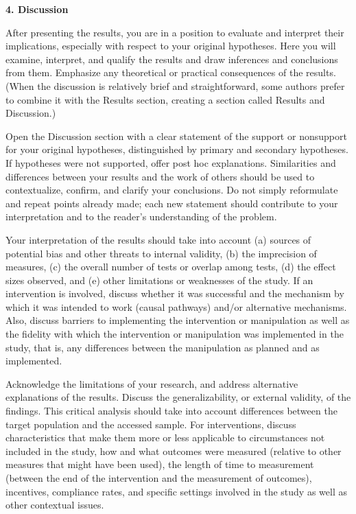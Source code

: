 \documentclass[twoside,10.5pt]{article}%
\begin{document}
\textbf{4. Discussion}

After presenting the results, you are in a position to evaluate and interpret their implications, especially with respect to your original hypotheses. Here you will examine, interpret, and qualify the results and draw inferences and conclusions from them. Emphasize any theoretical or practical consequences of the results. (When the discussion is relatively brief and straightforward, some authors prefer to combine it with the Results section, creating a section called Results and Discussion.)

Open the Discussion section with a clear statement of the support or nonsupport for your original hypotheses, distinguished by primary and secondary hypotheses. If hypotheses were not supported, offer post hoc explanations. Similarities and differences between your results and the work of others should be used to contextualize, confirm, and clarify your conclusions. Do not simply reformulate and repeat points already made; each new statement should contribute to your interpretation and to the reader's understanding of the problem.

Your interpretation of the results should take into account (a) sources of potential bias and other threats to internal validity, (b) the imprecision of measures, (c) the overall number of tests or overlap among tests, (d) the effect sizes observed, and (e) other limitations or weaknesses of the study. If an intervention is involved, discuss whether it was successful and the mechanism by which it was intended to work (causal pathways) and/or alternative
mechanisms. Also, discuss barriers to implementing the intervention or manipulation as well as the fidelity with which the intervention or manipulation was implemented in the study, that is, any differences between the manipulation as planned and as implemented.

Acknowledge the limitations of your research, and address alternative explanations of the results. Discuss the generalizability, or external validity, of the findings. This critical analysis should take into account differences between the target population and the accessed sample. For interventions, discuss characteristics that make them more or less applicable to circumstances not included in the study, how and what outcomes were measured (relative to other measures that might have been used), the length of time to measurement (between the end of the intervention and the measurement of outcomes), incentives, compliance rates, and specific settings involved in the study as well as other contextual issues.
\end{document}
